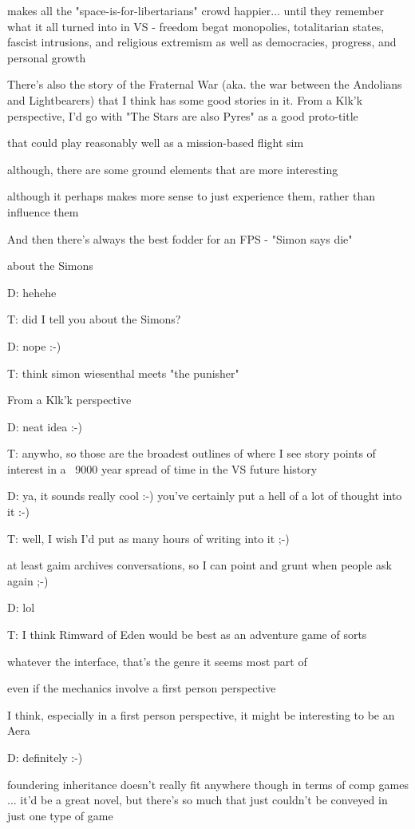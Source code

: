{makes all the "space-is-for-libertarians" crowd happier... until they remember what it all turned into in VS - freedom begat monopolies, totalitarian states, fascist intrusions, and religious extremism as well as democracies, progress, and personal growth

There's also the story of the Fraternal War (aka. the war between the Andolians and Lightbearers) that I think has some good stories in it. From a Klk'k perspective, I'd go with "The Stars are also Pyres" as a good proto-title

that could play reasonably well as a mission-based flight sim

although, there are some ground elements that are more interesting

although it perhaps makes more sense to just experience them, rather than influence them

And then there's always the best fodder for an FPS - "Simon says die"

about the Simons

D: hehehe

T: did I tell you about the Simons?

D: nope :-)

T: think simon wiesenthal meets "the punisher"

From a Klk'k perspective

D: neat idea :-)

T: anywho, so those are the broadest outlines of where I see story points of interest in a ~9000 year spread of time in the VS future history

D: ya, it sounds really cool :-) you've certainly put a hell of a lot of thought into it :-)

T: well, I wish I'd put as many hours of writing into it ;-)

at least gaim archives conversations, so I can point and grunt when people ask again ;-)

D: lol

T: I think Rimward of Eden would be best as an adventure game of sorts

whatever the interface, that's the genre it seems most part of

even if the mechanics involve a first person perspective

I think, especially in a first person perspective, it might be interesting to be an Aera

D: definitely :-)

foundering inheritance doesn't really fit anywhere though in terms of comp games ... it'd be a great novel, but there's so much that just couldn't be conveyed in just one type of game

}

